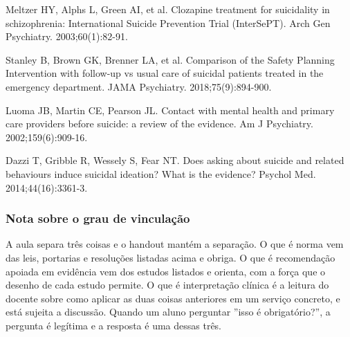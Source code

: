 Meltzer HY, Alphs L, Green AI, et al. Clozapine treatment for suicidality in schizophrenia: International Suicide Prevention Trial (InterSePT). Arch Gen Psychiatry. 2003;60(1):82-91.

Stanley B, Brown GK, Brenner LA, et al. Comparison of the Safety Planning Intervention with follow-up vs usual care of suicidal patients treated in the emergency department. JAMA Psychiatry. 2018;75(9):894-900.

Luoma JB, Martin CE, Pearson JL. Contact with mental health and primary care providers before suicide: a review of the evidence. Am J Psychiatry. 2002;159(6):909-16.

Dazzi T, Gribble R, Wessely S, Fear NT. Does asking about suicide and related behaviours induce suicidal ideation? What is the evidence? Psychol Med. 2014;44(16):3361-3.

\subsubsection*{Nota sobre o grau de vinculação}

A aula separa três coisas e o handout mantém a separação. O que é norma vem das leis, portarias e resoluções listadas acima e obriga. O que é recomendação apoiada em evidência vem dos estudos listados e orienta, com a força que o desenho de cada estudo permite. O que é interpretação clínica é a leitura do docente sobre como aplicar as duas coisas anteriores em um serviço concreto, e está sujeita a discussão. Quando um aluno perguntar ''isso é obrigatório?'', a pergunta é legítima e a resposta é uma dessas três.
